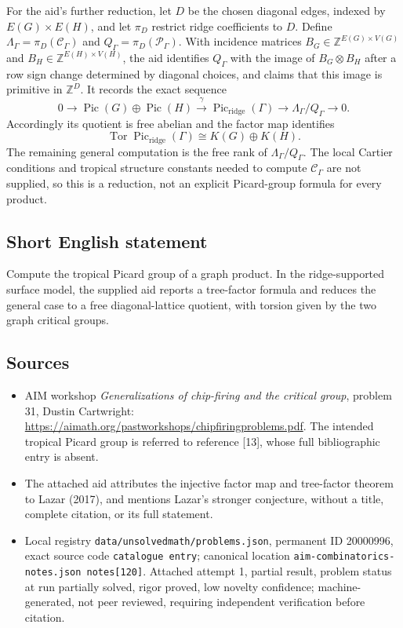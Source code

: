 \documentclass[11pt]{article}
\newcommand{\Z}{\mathbb{Z}}
\begin{document}
For the aid's further reduction, let $D$ be the chosen diagonal edges, indexed by $E(G)\times E(H)$, and let $\pi_D$ restrict ridge coefficients to $D$. Define
$\Lambda_\Gamma=\pi_D(\mathcal C_\Gamma)$ and $Q_\Gamma=\pi_D(\mathcal P_\Gamma)$. With incidence matrices $B_G\in\Z^{E(G)\times V(G)}$ and $B_H\in\Z^{E(H)\times V(H)}$, the aid identifies $Q_\Gamma$ with the image of $B_G\otimes B_H$ after a row sign change determined by diagonal choices, and claims that this image is primitive in $\Z^D$. It records the exact sequence
\[
 0\longrightarrow\operatorname{Pic}(G)\oplus\operatorname{Pic}(H)
 \xrightarrow{\gamma}\operatorname{Pic}_{\mathrm{ridge}}(\Gamma)
 \longrightarrow\Lambda_\Gamma/Q_\Gamma\longrightarrow0.
\]
Accordingly its quotient is free abelian and the factor map identifies
\[
 \operatorname{Tor}\operatorname{Pic}_{\mathrm{ridge}}(\Gamma)
 \cong K(G)\oplus K(H).
\]
The remaining general computation is the free rank of $\Lambda_\Gamma/Q_\Gamma$. The local Cartier conditions and tropical structure constants needed to compute $\mathcal C_\Gamma$ are not supplied, so this is a reduction, not an explicit Picard-group formula for every product.
\subsection{Short English statement}
Compute the tropical Picard group of a graph product. In the ridge-supported surface model, the supplied aid reports a tree-factor formula and reduces the general case to a free diagonal-lattice quotient, with torsion given by the two graph critical groups.
\subsection{Sources}
\begin{itemize}
\item AIM workshop \emph{Generalizations of chip-firing and the critical group}, problem 31, Dustin Cartwright: \url{https://aimath.org/pastworkshops/chipfiringproblems.pdf}. The intended tropical Picard group is referred to reference [13], whose full bibliographic entry is absent.
\item The attached aid attributes the injective factor map and tree-factor theorem to Lazar (2017), and mentions Lazar's stronger conjecture, without a title, complete citation, or its full statement.
\item Local registry \texttt{data/unsolvedmath/problems.json}, permanent ID 20000996, exact source code \texttt{catalogue entry}; canonical location \texttt{aim-combinatorics-notes.json notes[120]}. Attached attempt 1, partial result, problem status at run partially solved, rigor proved, low novelty confidence; machine-generated, not peer reviewed, requiring independent verification before citation.
\end{itemize}
\end{document}
